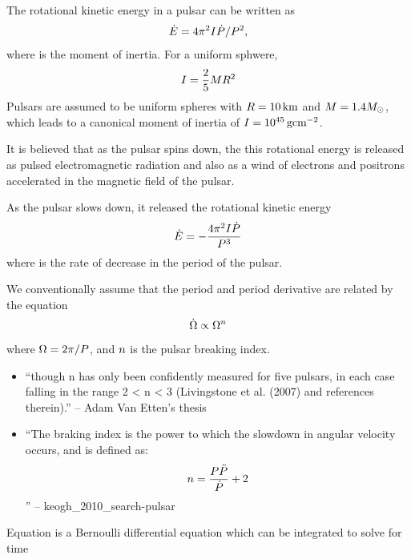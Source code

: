 The rotational kinetic energy in a pulsar can be written as
\begin{equation}
  \dot{E} = 4\pi^2 I \dot{P}/P^2,
\end{equation}
where \momentofinertia is the moment of inertia.
For a uniform sphwere,
\begin{equation}
  I = \frac{2}{5} M R^2
\end{equation}
Pulsars are assumed to be uniform spheres with $R=10\,\text{km}$
and $M=1.4M_{\odot}$, which leads to a canonical moment of inertia of
$I=10^{45}\,\text{g}\text{cm}^{-2}$.

It is believed that as the pulsar spins down, the this rotational energy
is released as pulsed electromagnetic radiation and also as a wind of
electrons and positrons accelerated in the magnetic field of the pulsar.

As the pulsar slows down, it released the rotational kinetic energy
\begin{equation}
  \dot{E} = - \frac{4 \pi^2 I \dot{P}}{P^3}
\end{equation}
where \perioddot is the rate of decrease in the period of the pulsar.


We conventionally assume that the period and period derivative are related
by the equation
\begin{equation}\eqnlabel{angular_frequency_derivative_relation}
  \angularfrequencydot \propto \angularfrequency^\breakingindex
\end{equation}
where $\Omega=2\pi/P$, and $n$
is the pulsar breaking index. 

\begin{itemize}
  \item ``though n has only been confidently measured for five pulsars,
  in each case falling in the range 2 < n < 3 (Livingstone et al. (2007)
  and references therein).'' -- Adam Van Etten's thesis
\item ``The braking index is the power to which the slowdown in angular
velocity occurs, and is defined as:
  \begin{equation}
    n = \frac{P \ddot{P}}{\dot{P}} + 2
  \end{equation}
  '' -- keogh\_2010\_search-pulsar
\end{itemize}

Equation  is
a Bernoulli differential equation which can be integrated to solve for time

